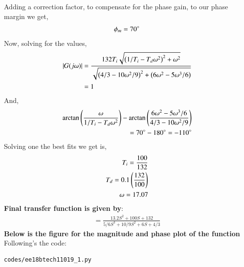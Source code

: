 \begin{enumerate}[label=\thesection.\arabic*.,ref=\thesection.\theenumi]
Adding a correction factor, to compensate for the phase gain,  to our phase margin we get, 
\begin{align}
    \phi_{m} = 70\degree
\end{align}
Now, solving for the values,\newline
\begin{align}
    {\left\vert G(j\omega)\right\vert} &= \frac{132 T_i\sqrt{\left(1/T_i-T_d\omega ^{2}\right)^2 + \omega ^2}}{\sqrt{\left(4/3-10\omega ^2/9\right)^2 + \left(6 \omega ^2 -5\omega ^3/6\right)}}\\
    &= 1
\end{align}
And,\newline
\begin{align}
    \arctan\left(\frac{\omega}{1/T_i-T_d\omega ^{2}}\right) - \arctan\left(\frac{6 \omega ^2 -5\omega ^3/6}{4/3-10\omega ^2/9}\right)\\
    = 70\degree-180\degree = -110\degree       
\end{align}
Solving one the best fits we get is,\newline
\begin{align}
    T_i = \frac{100}{132}\\
    T_d = 0.1\left(\frac{132}{100}\right)\\
    \omega = 17.07
\end{align}
\textbf{Final transfer function is given by}:
\begin{align}
 = \frac{13.2S^2+100S+132}{5/6S^3 + 10/9S^2 + 6S + 4/3}
\end{align}
\textbf{Below is the figure for the magnitude and phase plot of the function}\newline
Following's the code:
\begin{lstlisting}
codes/ee18btech11019_1.py
\end{lstlisting}


\end{enumerate}
